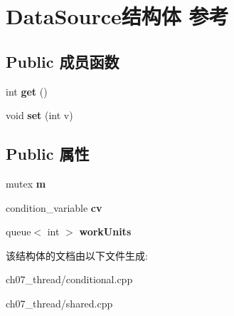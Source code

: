 \hypertarget{struct_data_source}{}\section{Data\+Source结构体 参考}
\label{struct_data_source}
\subsection*{Public 成员函数}
\begin{DoxyCompactItemize}
\item 
\mbox{\label{struct_data_source_aa1faddad589142ef0919f512f27ec54f}} 
int {\bfseries get} ()
\item 
\mbox{\label{struct_data_source_a7dbbbd0e14521c7edccce4774d775e3e}} 
void {\bfseries set} (int v)
\end{DoxyCompactItemize}
\subsection*{Public 属性}
\begin{DoxyCompactItemize}
\item 
\mbox{\label{struct_data_source_af05aceec5a5ce826ae3c0089a4eaf8e2}} 
mutex {\bfseries m}
\item 
\mbox{\label{struct_data_source_aadbb2e74faab194f59faa1c97a2a92c0}} 
condition\+\_\+variable {\bfseries cv}
\item 
\mbox{\label{struct_data_source_afef33b58d94d5b2cc4ed2fec53a4f716}} 
queue$<$ int $>$ {\bfseries work\+Units}
\end{DoxyCompactItemize}


该结构体的文档由以下文件生成\+:\begin{DoxyCompactItemize}
\item 
ch07\+\_\+thread/conditional.\+cpp\item 
ch07\+\_\+thread/shared.\+cpp\end{DoxyCompactItemize}
